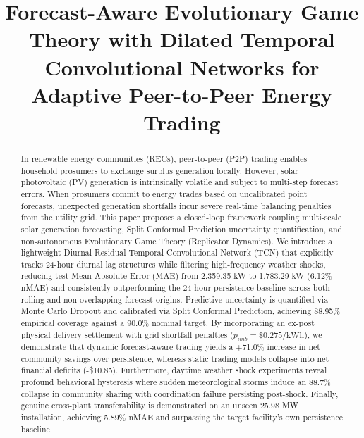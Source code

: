 \documentclass[conference]{IEEEtran}
\begin{document}
\title{Forecast-Aware Evolutionary Game Theory with Dilated Temporal Convolutional Networks for Adaptive Peer-to-Peer Energy Trading}

\author{
\and
{}
}

\maketitle

\begin{abstract}
In renewable energy communities (RECs), peer-to-peer (P2P) trading enables household prosumers to exchange surplus generation locally. However, solar photovoltaic (PV) generation is intrinsically volatile and subject to multi-step forecast errors. When prosumers commit to energy trades based on uncalibrated point forecasts, unexpected generation shortfalls incur severe real-time balancing penalties from the utility grid. This paper proposes a closed-loop framework coupling multi-scale solar generation forecasting, Split Conformal Prediction uncertainty quantification, and non-autonomous Evolutionary Game Theory (Replicator Dynamics). We introduce a lightweight Diurnal Residual Temporal Convolutional Network (TCN) that explicitly tracks 24-hour diurnal lag structures while filtering high-frequency weather shocks, reducing test Mean Absolute Error (MAE) from 2,359.35 kW to 1,783.29 kW (6.12\% nMAE) and consistently outperforming the 24-hour persistence baseline across both rolling and non-overlapping forecast origins. Predictive uncertainty is quantified via Monte Carlo Dropout and calibrated via Split Conformal Prediction, achieving 88.95\% empirical coverage against a 90.0\% nominal target. By incorporating an ex-post physical delivery settlement with grid shortfall penalties ($p_{imb} = \$0.275/\text{kWh}$), we demonstrate that dynamic forecast-aware trading yields a +71.0\% increase in net community savings over persistence, whereas static trading models collapse into net financial deficits (-\$10.85). Furthermore, daytime weather shock experiments reveal profound behavioral hysteresis where sudden meteorological storms induce an 88.7\% collapse in community sharing with coordination failure persisting post-shock. Finally, genuine cross-plant transferability is demonstrated on an unseen 25.98 MW installation, achieving 5.89\% nMAE and surpassing the target facility's own persistence baseline.
\end{abstract}
\end{document}
